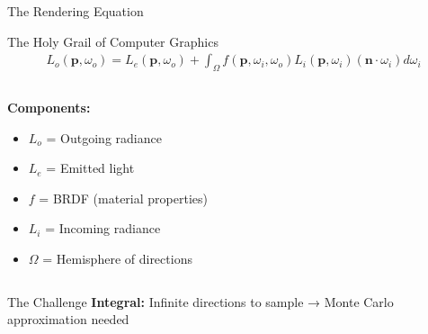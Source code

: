 \begin{frame}{The Rendering Equation}
    \begin{center}
        \begin{mathbox}{The Holy Grail of Computer Graphics}
            \begin{align}
                L_o(\mathbf{p}, \omega_o) = L_e(\mathbf{p}, \omega_o) + \int_\Omega f(\mathbf{p}, \omega_i, \omega_o) L_i(\mathbf{p}, \omega_i) (\mathbf{n} \cdot \omega_i) d\omega_i
            \end{align}
        \end{mathbox}
    \end{center}
    
    \begin{columns}
        \begin{column}{0.5\textwidth}
            \textbf{Components:}
            \begin{itemize}
                \item $L_o$ = Outgoing radiance
                \item $L_e$ = Emitted light
                \item $f$ = BRDF (material properties)
                \item $L_i$ = Incoming radiance
                \item $\Omega$ = Hemisphere of directions
            \end{itemize}
        \end{column}
        \begin{column}{0.5\textwidth}
        \end{column}
    \end{columns}
    
    \begin{conceptbox}{The Challenge}
        \textbf{Integral:} Infinite directions to sample → Monte Carlo approximation needed
    \end{conceptbox}
\end{frame}

